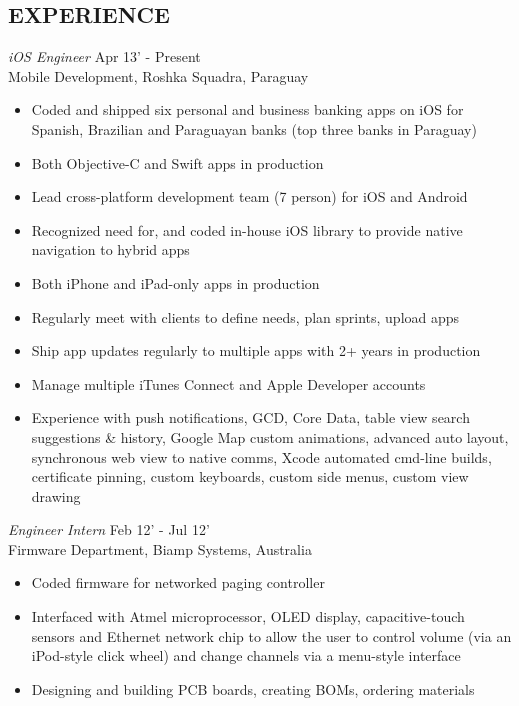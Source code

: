 \documentclass[margin]{res}
\begin{document}
\begin{resume}

\section{EXPERIENCE} {\sl iOS Engineer} \hfill Apr 13' - Present \\
                Mobile Development, Roshka Squadra, Paraguay  
                 \begin{itemize}  \itemsep -2pt %
                 \item Coded and shipped six personal and business banking apps on iOS for Spanish, Brazilian and Paraguayan banks (top three banks in Paraguay)
                 \item Both Objective-C and Swift apps in production
                 \item Lead cross-platform development team (7 person) for iOS and Android 
                 \item Recognized need for, and coded in-house iOS library to provide native navigation to hybrid apps
         	\item Both iPhone and iPad-only apps in production
		\item Regularly meet with clients to define needs, plan sprints, upload apps
		\item Ship app updates regularly to multiple apps with 2+ years in production
                 \item Manage multiple iTunes Connect and Apple Developer accounts
                 \item Experience with push notifications, GCD, Core Data, table view search suggestions \& history, Google Map custom animations, advanced auto layout, synchronous web view to native comms, Xcode automated cmd-line builds, certificate pinning, custom keyboards, custom side menus, custom view drawing
                 \end{itemize}
 
                {\sl Engineer Intern} \hfill            Feb 12' - Jul 12' \\
                Firmware Department, Biamp Systems, Australia 
                 \begin{itemize}  \itemsep -2pt %
                 \item Coded firmware for networked paging controller
                 \item Interfaced with Atmel microprocessor,
                  OLED display, capacitive-touch sensors and Ethernet network chip to allow the user to 
                  control volume (via an iPod-style click wheel) and change channels via a menu-style interface 
                  \item Designing and building PCB boards, creating BOMs, ordering materials
                 \end{itemize} 
                   

\end{resume}
\end{document}
